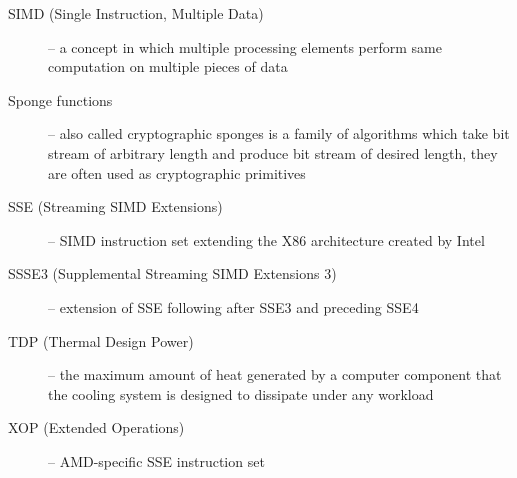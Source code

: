 \documentclass[nolof,digital]{fithesis3}
\begin{document}
\begin{description}
\item[SIMD (Single Instruction, Multiple Data)] -- a concept in which multiple processing elements perform same computation on multiple pieces of data

\item[Sponge functions] -- also called cryptographic sponges is a family of algorithms which take bit stream of arbitrary length and produce bit stream of desired length, they are often used  as cryptographic primitives

\item[SSE (Streaming SIMD Extensions)] -- SIMD instruction set extending the X86 architecture created by Intel

\item[SSSE3 (Supplemental Streaming SIMD Extensions 3)] -- extension of SSE following after SSE3 and preceding SSE4

\item[TDP (Thermal Design Power)] -- the maximum amount of heat generated by a computer component that the cooling system is designed to dissipate under any workload

\item[XOP (Extended Operations)] -- AMD-specific SSE instruction set
\end{description}
\end{document}
